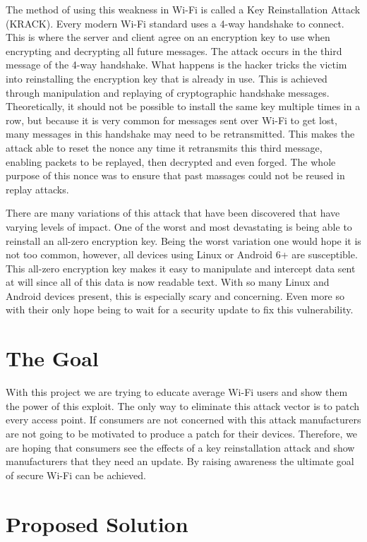 \documentclass{article}
\begin{document}
The method of using this weakness in Wi-Fi is called a Key
Reinstallation Attack (KRACK). Every modern Wi-Fi standard uses a 4-way
handshake to connect. This is where the server and client agree on an
encryption key to use when encrypting and decrypting all future
messages. The attack occurs in the third message of the 4-way handshake.
What happens is the hacker tricks the victim into reinstalling the
encryption key that is already in use. This is achieved through
manipulation and replaying of cryptographic handshake messages.
Theoretically, it should not be possible to install the same key
multiple times in a row, but because it is very common for messages sent
over Wi-Fi to get lost, many messages in this handshake may need to be
retransmitted. This makes the attack able to reset the nonce any time it
retransmits this third message, enabling packets to be replayed, then
decrypted and even forged. The whole purpose of this nonce was to ensure
that past massages could not be reused in replay attacks.

There are many variations of this attack that have been discovered that
have varying levels of impact. One of the worst and most devastating is
being able to reinstall an all-zero encryption key. Being the worst
variation one would hope it is not too common, however, all devices
using Linux or Android 6+ are susceptible. This all-zero encryption key
makes it easy to manipulate and intercept data sent at will since all of
this data is now readable text. With so many Linux and Android devices
present, this is especially scary and concerning. Even more so with
their only hope being to wait for a security update to fix this
vulnerability.

\section{The Goal}\label{the-goal}

With this project we are trying to educate average Wi-Fi users and show
them the power of this exploit. The only way to eliminate this attack
vector is to patch every access point. If consumers are not concerned
with this attack manufacturers are not going to be motivated to produce
a patch for their devices. Therefore, we are hoping that consumers see
the effects of a key reinstallation attack and show manufacturers that
they need an update. By raising awareness the ultimate goal of secure
Wi-Fi can be achieved.

\section{Proposed Solution}\label{proposed-solution}
\end{document}
